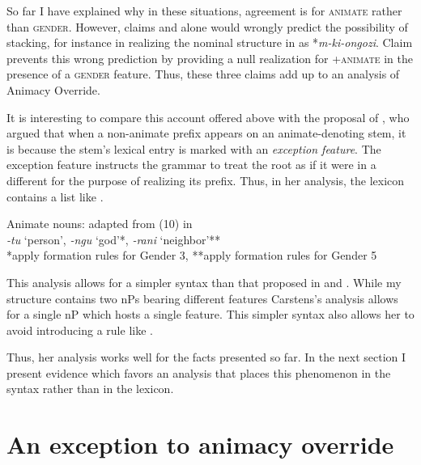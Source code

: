 \documentclass[output=paper,newtxmath,modfonts,nonflat,hidelinks]{langsci/langscibook}
\begin{document}
So far I have explained why in these situations, agreement is for \textsc{animate} rather than \textsc{gender}.  However, claims  and  alone would wrongly predict the possibility of  stacking, for instance in realizing the nominal structure in   as  *\textit{m-ki-ongozi}.  Claim  prevents this wrong prediction by providing a null realization for +\textsc{animate} in the presence of a \textsc{gender} feature. Thus, these three claims add up to an analysis of Animacy Override. 
 
It is interesting to compare this account offered above with the proposal of \citet{carstens91}, who argued that when a non-animate prefix appears on an animate-denoting stem, it is because the stem's lexical entry is marked with an \textit{exception feature}.  The exception feature instructs the grammar to treat the root as if it were in a different  for the purpose of realizing its  prefix. Thus, in her analysis, the lexicon contains a list like .
 
\ea\label{ex:pesetsky:carstinianlist} Animate nouns: \hfill adapted from (10) in \citet{carstens91} \\ \textit{-tu} `person', \textit{-ngu}  `god'*,   \textit{-rani}   `neighbor'** \\ *apply formation rules for Gender 3, **apply formation rules for Gender 5 \\  \z 

This analysis allows for a simpler syntax than that proposed in  and .  While my structure contains two nPs bearing different  features \linebreak Carstens's analysis allows for a single nP which hosts a single  feature.  This simpler syntax also allows her to avoid introducing a rule like .  

Thus, her analysis works well for the facts presented so far. In the next section I present evidence which favors an analysis that places this phenomenon in the syntax rather than in the lexicon.

\section{An exception to animacy override} \label{sec:pesetsky:exceptiontoAO}
\end{document}
